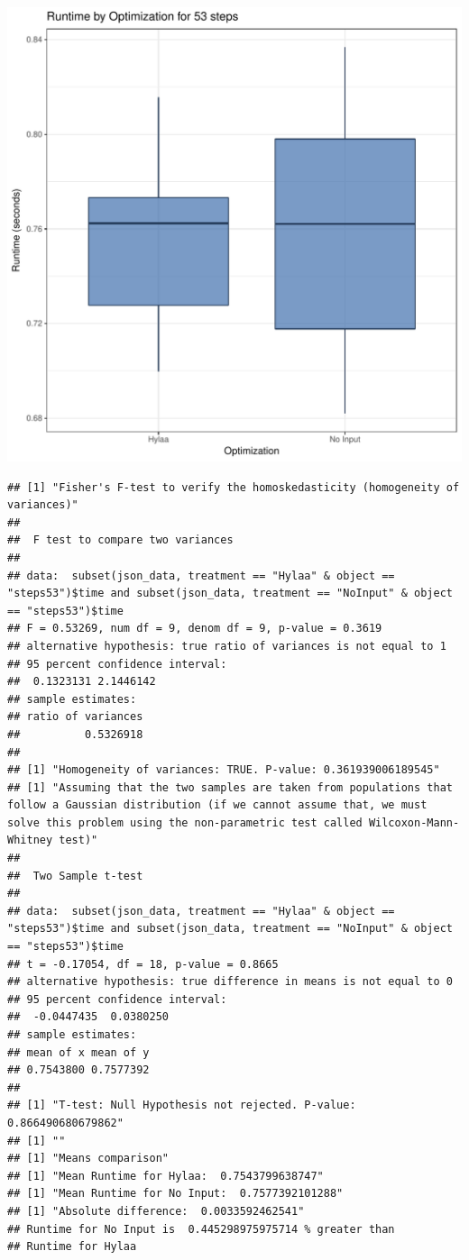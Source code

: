 \documentclass{article}\usepackage[]{graphicx}\usepackage[]{color}
\makeatletter
\def\maxwidth{ %
  \ifdim\Gin@nat@width>\linewidth
    \linewidth
  \else
    \Gin@nat@width
  \fi
}
\newenvironment{kframe}{%
 \def\at@end@of@kframe{}%
 \ifinner\ifhmode%
  \def\at@end@of@kframe{\end{minipage}}%
  \begin{minipage}{\columnwidth}%
 \fi\fi%
 \def\FrameCommand##1{\hskip\@totalleftmargin \hskip-\fboxsep
 \colorbox{shadecolor}{##1}\hskip-\fboxsep
     \hskip-\linewidth \hskip-\@totalleftmargin \hskip\columnwidth}%
 \MakeFramed {\advance\hsize-\width
   \@totalleftmargin\z@ \linewidth\hsize
   \@setminipage}}%
 {\par\unskip\endMakeFramed%
 \at@end@of@kframe}
\newenvironment{knitrout}{}{} %
\makeatother
\begin{document}
\begin{knitrout}
\color{fgcolor}
\includegraphics[width=\maxwidth]{figure/RH4_steps53-1} 
\begin{kframe}\begin{verbatim}
## [1] "Fisher's F-test to verify the homoskedasticity (homogeneity of variances)"
## 
## 	F test to compare two variances
## 
## data:  subset(json_data, treatment == "Hylaa" & object == "steps53")$time and subset(json_data, treatment == "NoInput" & object == "steps53")$time
## F = 0.53269, num df = 9, denom df = 9, p-value = 0.3619
## alternative hypothesis: true ratio of variances is not equal to 1
## 95 percent confidence interval:
##  0.1323131 2.1446142
## sample estimates:
## ratio of variances 
##          0.5326918 
## 
## [1] "Homogeneity of variances: TRUE. P-value: 0.361939006189545"
## [1] "Assuming that the two samples are taken from populations that follow a Gaussian distribution (if we cannot assume that, we must solve this problem using the non-parametric test called Wilcoxon-Mann-Whitney test)"
## 
## 	Two Sample t-test
## 
## data:  subset(json_data, treatment == "Hylaa" & object == "steps53")$time and subset(json_data, treatment == "NoInput" & object == "steps53")$time
## t = -0.17054, df = 18, p-value = 0.8665
## alternative hypothesis: true difference in means is not equal to 0
## 95 percent confidence interval:
##  -0.0447435  0.0380250
## sample estimates:
## mean of x mean of y 
## 0.7543800 0.7577392 
## 
## [1] "T-test: Null Hypothesis not rejected. P-value: 0.866490680679862"
## [1] ""
## [1] "Means comparison"
## [1] "Mean Runtime for Hylaa:  0.7543799638747"
## [1] "Mean Runtime for No Input:  0.7577392101288"
## [1] "Absolute difference:  0.0033592462541"
## Runtime for No Input is  0.445298975975714 % greater than 
## Runtime for Hylaa
\end{verbatim}
\end{kframe}
\end{knitrout}
\end{document}
